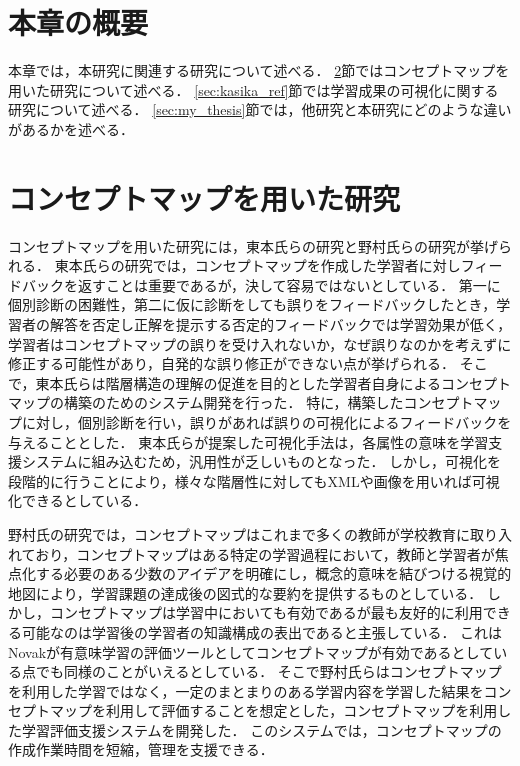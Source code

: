 \section{本章の概要}
本章では，本研究に関連する研究について述べる．
\ref{sec:concept_ref}節ではコンセプトマップを用いた研究について述べる．
\ref{sec:kasika_ref}節では学習成果の可視化に関する研究について述べる．
\ref{sec:my_thesis}節では，他研究と本研究にどのような違いがあるかを述べる．

\section{コンセプトマップを用いた研究}\label{sec:concept_ref}
コンセプトマップを用いた研究には，東本氏らの研究\cite{toumoto}と野村氏らの研究\cite{nomura_manabu}が挙げられる．
東本氏らの研究では，コンセプトマップを作成した学習者に対しフィードバックを返すことは重要であるが，決して容易ではないとしている．
第一に個別診断の困難性，第二に仮に診断をしても誤りをフィードバックしたとき，学習者の解答を否定し正解を提示する否定的フィードバックでは学習効果が低く，学習者はコンセプトマップの誤りを受け入れないか，なぜ誤りなのかを考えずに修正する可能性があり，自発的な誤り修正ができない点が挙げられる．
そこで，東本氏らは階層構造の理解の促進を目的とした学習者自身によるコンセプトマップの構築のためのシステム開発を行った．
特に，構築したコンセプトマップに対し，個別診断を行い，誤りがあれば誤りの可視化によるフィードバックを与えることとした．
東本氏らが提案した可視化手法は，各属性の意味を学習支援システムに組み込むため，汎用性が乏しいものとなった．
しかし，可視化を段階的に行うことにより，様々な階層性に対してもXMLや画像を用いれば可視化できるとしている．

野村氏の研究では，コンセプトマップはこれまで多くの教師が学校教育に取り入れており，コンセプトマップはある特定の学習過程において，教師と学習者が焦点化する必要のある少数のアイデアを明確にし，概念的意味を結びつける視覚的地図により，学習課題の達成後の図式的な要約を提供するものとしている．
しかし，コンセプトマップは学習中においても有効であるが最も友好的に利用できる可能なのは学習後の学習者の知識構成の表出であると主張している．
これはNovak\cite{concept}\cite{novak}が有意味学習の評価ツールとしてコンセプトマップが有効であるとしている点でも同様のことがいえるとしている．
そこで野村氏らはコンセプトマップを利用した学習ではなく，一定のまとまりのある学習内容を学習した結果をコンセプトマップを利用して評価することを想定とした，コンセプトマップを利用した学習評価支援システムを開発した．
このシステムでは，コンセプトマップの作成作業時間を短縮，管理を支援できる．

